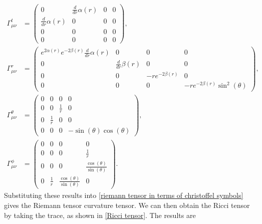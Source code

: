 \begin{align}
    \Gamma^t_{\mu \nu}
    & =
    \left(
        \begin{matrix}
            0 & \frac{d}{d r} \alpha{\left(r \right)} & 0 & 0\\\frac{d}{d r} \alpha{\left(r \right)} & 0 & 0 & 0\\0 & 0 & 0 & 0\\0 & 0 & 0 & 0
        \end{matrix}
    \right), \\
    \Gamma^r_{\mu \nu}
    &=
    \left(
        \begin{matrix}
            e^{2 \alpha{\left(r \right)}} e^{- 2 \beta{\left(r \right)}} \frac{d}{d r} \alpha{\left(r \right)} & 0 & 0 & 0\\0 & \frac{d}{d r} \beta{\left(r \right)} & 0 & 0\\0 & 0 & - r e^{- 2 \beta{\left(r \right)}} & 0\\0 & 0 & 0 & - r e^{- 2 \beta{\left(r \right)}} \sin^{2}{\left(\theta \right)}
        \end{matrix}
     \right), \\
     \Gamma^\theta_{\mu \nu} 
     & =
     \left(
         \begin{matrix}
            0 & 0 & 0 & 0\\0 & 0 & \frac{1}{r} & 0\\0 & \frac{1}{r} & 0 & 0\\0 & 0 & 0 & - \sin{\left(\theta \right)} \cos{\left(\theta \right)}
        \end{matrix}
    \right), \\
    \Gamma^\phi_{\mu \nu} 
    &=
    \left(
        \begin{matrix}
            0 & 0 & 0 & 0\\0 & 0 & 0 & \frac{1}{r}\\0 & 0 & 0 & \frac{\cos{\left(\theta \right)}}{\sin{\left(\theta \right)}}\\0 & \frac{1}{r} & \frac{\cos{\left(\theta \right)}}{\sin{\left(\theta \right)}} & 0
        \end{matrix}
    \right).
\end{align}
%
Substituting these results into \autoref{riemann tensor in terms of christoffel symbols} gives the Riemann tensor curvature tensor.
We can then obtain the Ricci tensor by taking the trace, as shown in \autoref{Ricci tensor}.
The results are
%

